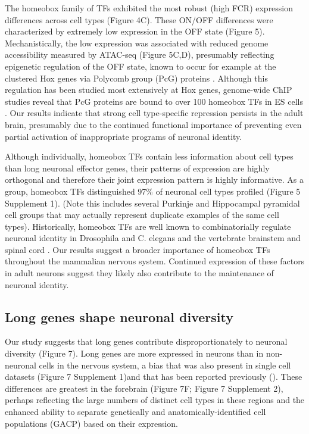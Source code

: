 The homeobox family of TFs exhibited the most robust (high FCR) expression differences across cell types (Figure 4C). These ON/OFF differences were characterized by extremely low expression in the OFF state (Figure 5). Mechanistically, the low expression was associated with reduced genome accessibility measured by ATAC-seq (Figure 5C,D), presumably reflecting epigenetic regulation of the OFF state, known to occur for example at the clustered Hox genes via Polycomb group (PcG) proteins \citep{Montavon_2014}. Although this regulation has been studied most extensively at Hox genes, genome-wide ChIP studies reveal that PcG proteins are bound to over 100 homeobox TFs in ES cells \citep{Boyer_2006}. Our results indicate that strong cell type-specific repression persists in the adult brain, presumably due to the continued functional importance of preventing even partial activation of inappropriate programs of neuronal identity. 

Although individually, homeobox TFs contain less information about cell types than long neuronal effector genes, their patterns of expression are highly orthogonal and therefore their joint expression pattern is highly informative. As a group, homeobox TFs distinguished 97\% of neuronal cell types profiled (Figure 5 Supplement 1). (Note this includes several Purkinje and Hippocampal pyramidal cell groups that may actually represent duplicate examples of the same cell types). Historically, homeobox TFs are well known to combinatorially regulate neuronal identity in Drosophila and C. elegans \citep{Kratsios_2017} and the vertebrate brainstem and spinal cord \citep{Dasen_2009,Philippidou_2013}. Our results suggest a broader importance of homeobox TFs throughout the mammalian nervous system. Continued expression of these factors in adult neurons suggest they likely also contribute to the maintenance of neuronal identity.

\subsection{Long genes shape neuronal diversity}
Our study suggests that long genes contribute disproportionately to neuronal diversity (Figure 7). Long genes are more expressed in neurons than in non-neuronal cells in the nervous system, a bias that was also present in single cell datasets (Figure 7 Supplement 1)and that has been reported previously (). These differences are greatest in the forebrain (Figure 7F; Figure 7 Supplement 2), perhaps reflecting the large numbers of distinct cell types in these regions and the enhanced ability to separate genetically and anatomically-identified cell populations (GACP) based on their expression. 

